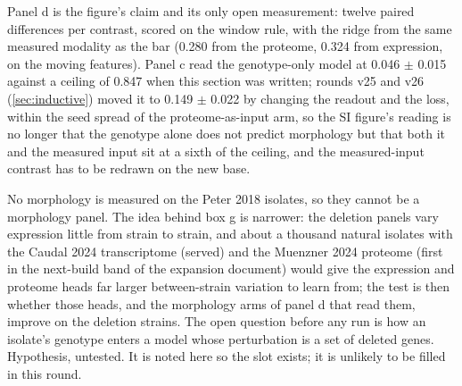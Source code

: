 Panel d is the figure's claim and its only open
measurement: twelve paired differences per contrast, scored on the window rule, with the
ridge from the same measured modality as the bar (0.280 from the proteome, 0.324 from
expression, on the moving features). Panel c read the genotype-only model at
0.046 $\pm$ 0.015 against a ceiling of 0.847 when this section was written; rounds v25 and
v26 (\cref{sec:inductive}) moved it to 0.149 $\pm$ 0.022 by changing the readout and the loss,
within the seed spread of the proteome-as-input arm, so the SI figure's reading is no longer
that the genotype alone does not predict morphology but that both it and the measured input
sit at a sixth of the ceiling, and the measured-input contrast has to be redrawn on the new
base.

 No morphology is measured on
the Peter 2018 isolates, so they cannot be a morphology panel. The idea behind box g is
narrower: the deletion panels vary expression little from strain to strain, and about a
thousand natural isolates with the Caudal 2024 transcriptome (served) and the Muenzner 2024
proteome (first in the next-build band of the expansion document) would give the expression
and proteome heads far larger between-strain variation to learn from; the test is then
whether those heads, and the morphology arms of panel d that read them, improve on the
deletion strains. The open question before any run is how an isolate's genotype enters a
model whose perturbation is a set of deleted genes. Hypothesis, untested. It is noted here so
the slot exists; it is unlikely to be filled in this round.



